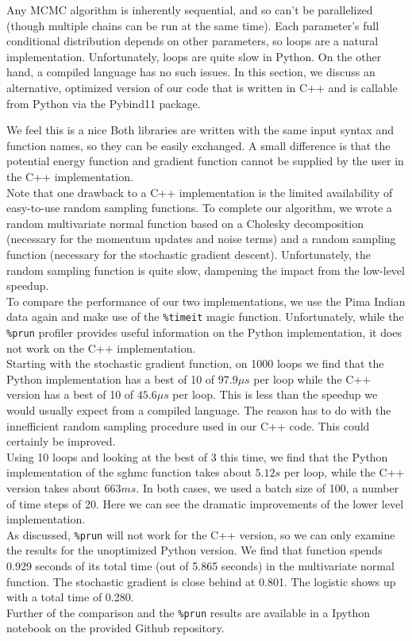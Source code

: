 Any MCMC algorithm is inherently sequential, and so can't be parallelized (though multiple chains can be run at the same time). Each parameter's full conditional distribution depends on other parameters, so loops are a natural implementation. Unfortunately, loops are quite slow in Python. On the other hand, a compiled language has no such issues. In this section, we discuss an alternative, optimized version of our code that is written in C++ and is callable from Python via the Pybind11 package.

We feel this is a nice Both libraries are written with the same input syntax and function names, so they can be easily exchanged. A small difference is that the potential energy function and gradient function cannot be supplied by the user in the C++ implementation.\\

Note that one drawback to a C++ implementation is the limited availability of easy-to-use random sampling functions. To complete our algorithm, we wrote a random multivariate normal function based on a Cholesky decomposition (necessary for the momentum updates and noise terms) and a random sampling function (necessary for the stochastic gradient descent). Unfortunately, the random sampling function is quite slow, dampening the impact from the low-level speedup.\\

To compare the performance of our two implementations, we use the Pima Indian data again and make use of the {\tt \%timeit} magic function. Unfortunately, while the {\tt \%prun} profiler provides useful information on the Python implementation, it does not work on the C++ implementation.\\
	
Starting with the stochastic gradient function, on 1000 loops we find that the Python implementation has a best of 10 of $97.9 \mu s$ per loop while the C++ version has a best of 10 of $45.6 \mu s$ per loop. This is less than the speedup we would usually expect from a compiled language. The reason has to do with the innefficient random sampling procedure used in our C++ code. This could certainly be improved.\\

Using 10 loops and looking at the best of 3 this time, we find that the Python implementation of the sghmc function takes about $5.12 s$ per loop, while the C++ version takes about $663 ms$. In both cases, we used a batch size of 100, a number of time steps of 20. Here we can see the dramatic improvements of the lower level implementation.\\

As discussed, {\tt \%prun} will not work for the C++ version, so we can only examine the results for the unoptimized Python version. We find that function spends 0.929 seconds of its total time (out of 5.865 seconds) in the multivariate normal function. The stochastic gradient is close behind at 0.801. The logistic shows up with a total time of 0.280.\\

Further of the comparison and the {\tt \%prun} results are available in a Ipython notebook on the provided Github repository.


